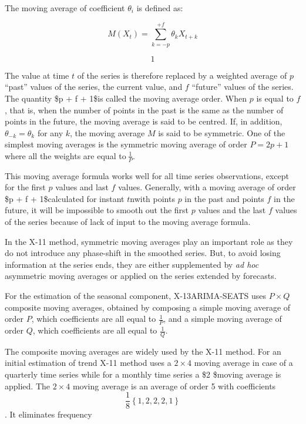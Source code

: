 \documentclass[
  letterpaper,
  DIV=11,
  numbers=noendperiod]{scrreprt}
\begin{document}
The moving average of coefficient \(\theta_{i}\) is defined as:

\[M\left( X_{t} \right) = \sum_{k = - p}^{+ f}\theta_{k}X_{t + k}\]

\[1\]

The value at time \(t\) of the series is therefore replaced by a
weighted average of \(p\) ``past'' values of the series, the current
value, and \(f\) ``future'' values of the series. The quantity \$p + f +
1\$is called the moving average order. When \(p\) is equal to \(f\),
that is, when the number of points in the past is the same as the number
of points in the future, the moving average is said to be centred. If,
in addition, \(\theta_{- k} = \theta_{k}\) for any \(k\), the moving
average \(M\) is said to be symmetric. One of the simplest moving
averages is the symmetric moving average of order \(P = 2p + 1\) where
all the weights are equal to\(\ \frac{1}{P}\).

This moving average formula works well for all time series observations,
except for the first \(p\) values and last \(f\) values. Generally, with
a moving average of order \$p + f + 1\$calculated for instant \(t\)nwith
points \(p\) in the past and points \(f\) in the future, it will be
impossible to smooth out the first \(p\) values and the last \(f\)
values of the series because of lack of input to the moving average
formula.

In the X-11 method, symmetric moving averages play an important role as
they do not introduce any phase-shift in the smoothed series. But, to
avoid losing information at the series ends, they are either
supplemented by \emph{ad hoc} asymmetric moving averages or applied on
the series extended by forecasts.

For the estimation of the seasonal component, X-13ARIMA-SEATS uses
\(P \times Q\) composite moving averages, obtained by composing a simple
moving average of order \(P\), which coefficients are all equal to
\(\frac{1}{P}\), and a simple moving average of order \(Q\), which
coefficients are all equal to \(\frac{1}{Q}\).

The composite moving averages are widely used by the X-11 method. For an
initial estimation of trend X-11 method uses a \(2 \times 4\) moving
average in case of a quarterly time series while for a monthly time
series a \$2 \$moving average is applied. The \(2 \times 4\)
moving average is an average of order 5 with coefficients
\[\frac{1}{8}\left\{1, 2, 2, 2, 1\right\}\]. It eliminates frequency
\end{document}

